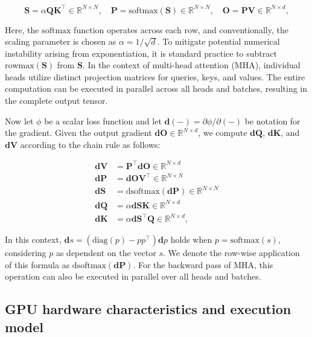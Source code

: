 \begin{equation*}
  \mathbf{S} = \alpha \mathbf{Q} \mathbf{K}^\top \in \mathbb{R}^{N \times N}, \quad \mathbf{P} = \mathrm{softmax}(\mathbf{S}) \in \mathbb{R}^{N \times N}, \quad \mathbf{O} = \mathbf{P}\mathbf{V} \in \mathbb{R}^{N \times d},
\end{equation*}

Here, the $\mathrm{softmax}$ function operates across each row, and conventionally, the scaling parameter is chosen as $\alpha = 1/\sqrt{d}$. To mitigate potential numerical instability arising from exponentiation, it is standard practice to subtract $\mathrm{rowmax}(\mathbf{S})$ from $\mathbf{S}$. In the context of multi-head attention (MHA), individual heads utilize distinct projection matrices for queries, keys, and values. The entire computation can be executed in parallel across all heads and batches, resulting in the complete output tensor.

Now let $\phi$ be a scalar loss function and let $\mathbf{d}(-) = \partial \phi / \partial (-)$ be notation for the gradient. Given the output gradient $\mathbf{dO} \in \mathbb{R}^{N \times d}$, we compute $\mathbf{dQ}$, $\mathbf{dK}$, and $\mathbf{dV}$ according to the chain rule as follows:

\begin{align*}
  \mathbf{dV} &= \mathbf{P}^\top \mathbf{dO} \in \mathbb{R}^{N \times d} \\
  \mathbf{dP} &= \mathbf{dO} \mathbf{V}^\top \in \mathbb{R}^{N \times N} \\
  \mathbf{dS} &= \mathrm{dsoftmax} (\mathbf{dP}) \in \mathbb{R}^{N \times N} \\
  \mathbf{dQ} &= \alpha \mathbf{dS} \mathbf{K} \in \mathbb{R}^{N \times d} \\
  \mathbf{dK} &= \alpha \mathbf{dS}^\top \mathbf{Q} \in \mathbb{R}^{N \times d},
\end{align*}

In this context, $\mathbf{d}s = (\mathrm{diag}(p) - p p^\top)\mathbf{d}p$ holds when $p = \mathrm{softmax}(s)$, considering $p$ as dependent on the vector $s$. We denote the row-wise application of this formula as $\mathrm{dsoftmax}(\mathbf{dP})$. For the backward pass of MHA, this operation can also be executed in parallel over all heads and batches.

\subsection{GPU hardware characteristics and execution model}
\label{subsec:hardware}

